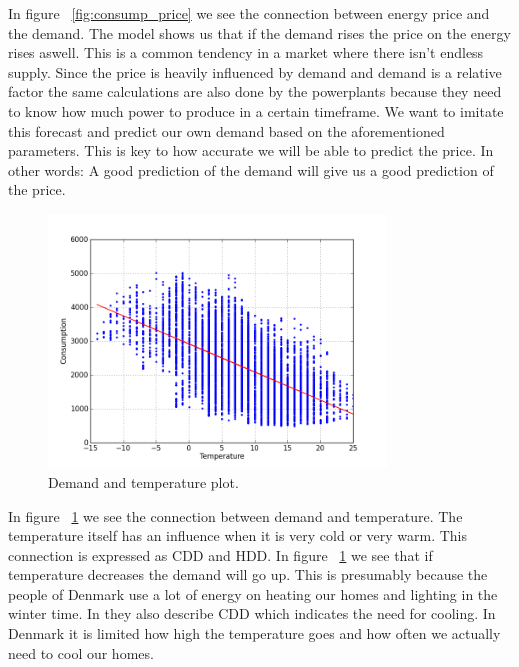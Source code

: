 In figure ~\ref{fig:consump_price} we see the connection between energy price and the demand. The model shows us that if the demand rises the price on the energy rises aswell. This is a common tendency in a market where there isn't endless supply. Since the price is heavily influenced by demand and demand is a relative factor the same calculations are also done by the powerplants because they need to know how much power to produce in a certain timeframe. We want to imitate this forecast and predict our own demand based on the aforementioned parameters. This is key to how accurate we will be able to predict the price. In other words: A good prediction of the demand will give us a good prediction of the price.

\begin{figure}[H]
\centering
\includegraphics[width=0.8\textwidth ,natwidth=410,natheight=237]{billeder/energy_price_plots/consump_temp.png}
\caption{Demand and temperature plot.}
\label{fig:consump_temp}
\end{figure}


In figure ~\ref{fig:consump_temp} we see the connection between demand and temperature. The temperature itself has an influence when it is very cold or very warm. This connection is expressed as CDD and HDD. In figure ~\ref{fig:consump_temp} we see that if temperature decreases the demand will go up. This is presumably because the people of Denmark use a lot of energy on heating our homes and lighting in the winter time. In \cite{19} they also describe CDD which indicates the need for cooling. In Denmark it is limited how high the temperature goes and how often we actually need to cool our homes.

